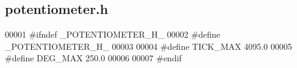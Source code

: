 \subsection{potentiometer.\+h}
\label{a00056_source}

\begin{DoxyCode}
00001 \textcolor{preprocessor}{#ifndef \_POTENTIOMETER\_H\_}
00002 \textcolor{preprocessor}{#define \_POTENTIOMETER\_H\_}
00003 
00004 \textcolor{preprocessor}{#define TICK\_MAX 4095.0}
00005 \textcolor{preprocessor}{#define DEG\_MAX 250.0}
00006 
00007 \textcolor{preprocessor}{#endif}
\end{DoxyCode}
